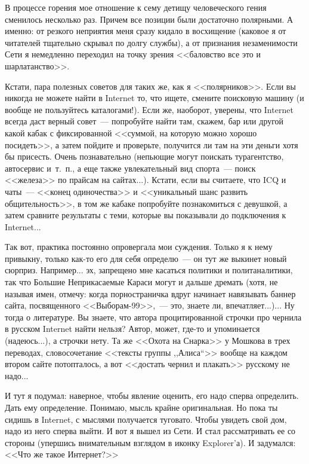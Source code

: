 \documentclass{scrbook}
\newcommand{\glqq}{,,}
\newcommand{\grqq}{``}
\newcommand{\flqq}{<<}
\newcommand{\frqq}{>>}
\newcommand{\mdash}{~--- }
\newcommand{\commamdash}{~--- } %
\begin{document}
В процессе горения мое отношение к сему детищу человеческого гения сменилось несколько раз. Причем все позиции были достаточно полярными. А именно: от резкого неприятия меня сразу кидало в восхищение (каковое я от читателей тщательно скрывал по долгу службы), а от признания незаменимости Сети я немедленно переходил на точку зрения {\flqq}баловство все это и шарлатанство{\frqq}.

Кстати, пара полезных советов для таких же, как я {\flqq}полярников{\frqq}. Если вы никогда не можете найти в Internet то, что ищете, смените поисковую машину (и вообще не пользуйтесь каталогами!). Если же, наоборот, уверены, что Internet всегда даст верный совет{\mdash}попробуйте найти там, скажем, бар или другой какой кабак с фиксированной {\flqq}суммой, на которую можно хорошо посидеть{\frqq}, а затем пойдите и проверьте, получится ли там на эти деньги хотя бы присесть. Очень познавательно (непьющие могут поискать турагентство, автосервис и~т.~п., а еще также увлекательный вид спорта{\mdash}поиск {\flqq}железа{\frqq} по прайсам на сайтах...). Кстати, если вы считаете, что ICQ и чаты{\mdash}{\flqq}конец одиночества{\frqq} и {\flqq}уникальный шанс развить общительность{\frqq}, в том же кабаке попробуйте познакомиться с девушкой, а затем сравните результаты с теми, которые вы показывали до подключения к Internet...

Так вот, практика постоянно опровергала мои суждения. Только я к нему привыкну, только как-то его для себя определю{\mdash}он тут же выкинет новый сюрприз. Например... эх, запрещено мне касаться политики и политаналитики, так что Большие Неприкасаемые Караси могут и дальше дремать (хотя, не называя имен, отмечу: когда порностраничка вдруг начинает навязывать баннер сайта, посвященного {\flqq}Выборам-99{\frqq},{\commamdash}это, знаете ли, впечатляет...)... Ну тогда о литературе. Вы знаете, что автора процитированной строчки про чернила в русском Internet найти нельзя? Автор, может, где-то и упоминается (надеюсь...), а строчки нету. Та же {\flqq}Охота на Снарка{\frqq} у Мошкова в трех переводах, словосочетание {\flqq}тексты группы {\glqq}Алиса{\grqq}{\frqq} вообще на каждом втором сайте потопталось, а вот {\flqq}достать чернил и плакать{\frqq} русскому не надо...

И тут я подумал: наверное, чтобы явление оценить, его надо сперва определить. Дать ему определение. Понимаю, мысль крайне оригинальная. Но пока ты сидишь в Internet, с мыслями получается туговато. Чтобы увидеть свой дом, надо из него сперва выйти. И вот я вышел из Сети. И стал рассматривать ее со стороны (упершись внимательным взглядом в иконку Explorer'а). И задумался: {\flqq}Что же такое Интернет?{\frqq}
\end{document}
